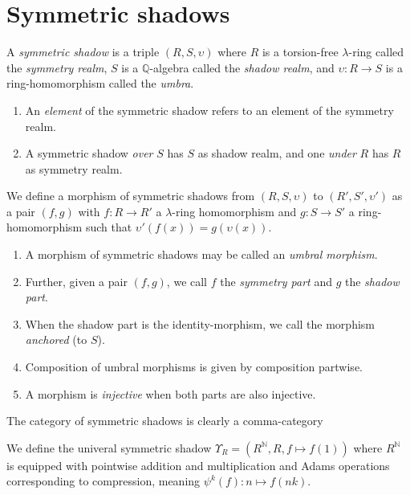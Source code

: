 
\section{Symmetric shadows}

\begin{definition}
  A \emph{symmetric shadow} is a triple $(R, S, \upsilon)$ where $R$ is a torsion-free $\lambda$-ring called the \emph{symmetry realm}, $S$ is a $\mathbb{Q}$-algebra called the \emph{shadow realm}, and $\upsilon: R \to S$ is a ring-homomorphism called the \emph{umbra}. 
  \begin{enumerate}
    \item An \emph{element} of the symmetric shadow refers to an element of the symmetry realm. 
    \item A symmetric shadow \emph{over} $S$ has $S$ as shadow realm, and one \emph{under} $R$ has $R$ as symmetry realm.
  \end{enumerate}
\end{definition}

\begin{definition}
  We define a morphism of symmetric shadows from $(R, S, \upsilon)$ to $(R', S', \upsilon')$ as a pair $(f, g)$ with $f : R \to R'$ a $\lambda$-ring homomorphism and $g : S \to S'$ a ring-homomorphism such that $\upsilon'(f(x)) = g(\upsilon(x))$. 
  \begin{enumerate}
    \item A morphism of symmetric shadows may be called an \emph{umbral morphism}. 
    \item Further, given a pair $(f, g)$, we call $f$ the \emph{symmetry part} and $g$ the \emph{shadow part}. 
    \item When the shadow part is the identity-morphism, we call the morphism \emph{anchored} (to $S$). 
    \item Composition of umbral morphisms is given by composition partwise. 
    \item A morphism is \emph{injective} when both parts are also injective. 
  \end{enumerate}
\end{definition}

\begin{remark}
  The category of symmetric shadows is clearly a comma-category
\end{remark}

\begin{definition}
  We define the univeral symmetric shadow $\Upsilon_R = (R^{\mathbb{N}}, R, f \mapsto f(1))$ where $R^{\mathbb{N}}$ is equipped with pointwise addition and multiplication and Adams operations corresponding to compression, meaning $\psi^k(f) : n \mapsto f(nk)$.
\end{definition}

